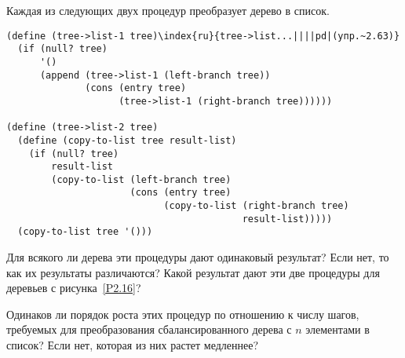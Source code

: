\pagebreak
\begin{exercise}{2.63}\label{EX2.63}%
  Каждая из следующих двух процедур преобразует дерево в список.

\begin{Verbatim}[fontsize=\small]
(define (tree->list-1 tree)\index{ru}{tree->list...||||pd|(упр.~2.63)}
  (if (null? tree)
      '()
      (append (tree->list-1 (left-branch tree))
              (cons (entry tree)
                    (tree->list-1 (right-branch tree))))))

(define (tree->list-2 tree)
  (define (copy-to-list tree result-list)
    (if (null? tree)
        result-list
        (copy-to-list (left-branch tree)
                      (cons (entry tree)
                            (copy-to-list (right-branch tree)
                                          result-list)))))
  (copy-to-list tree '()))
\end{Verbatim}

\begin{plainenum}


\item
Для всякого ли дерева эти процедуры дают
одинаковый результат?  Если нет, то как их результаты различаются?
Какой результат дают эти две процедуры для деревьев с рисунка~\ref{P2.16}?

\item
Одинаков ли порядок роста этих процедур по
отношению к числу шагов, требуемых для преобразования
сбалансированного дерева с $n$ элементами в список?  Если
нет, которая из них растет медленнее?
\end{plainenum}
\end{exercise}
